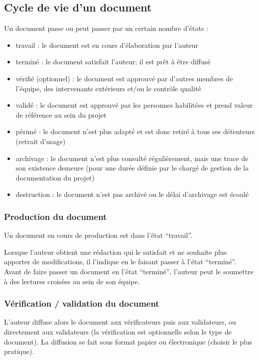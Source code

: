 \documentclass[a4paper]{article}
\begin{document}

\subsection{Cycle de vie d'un document}

Un document passe ou peut passer par un certain nombre d'états :

\begin{itemize}
\item travail : le document est en cours d'élaboration par l'auteur
\item terminé : le document satisfait l'auteur; il est prêt à être diffusé
\item vérifié (optionnel) : le document est approuvé par d'autres membres de l'équipe, des intervenants extérieurs et/ou le contrôle qualité
\item validé : le document est approuvé par les personnes habilitées et prend valeur de référence au sein du projet
\item périmé : le document n’est plus adapté et est donc retiré à tous ses détenteurs (retrait d'usage)
\item archivage : le document n'est plus consulté régulièrement, mais une trace de son existence demeure (pour une durée définie par le chargé de gestion de la documentation du projet)
\item destruction : le document n'est pas archivé ou le délai d'archivage est écoulé
\end{itemize}


\subsubsection{Production du document}

Un document en cours de production est dans l'état ``travail''.

Lorsque l'auteur obtient une rédaction qui le satisfait et ne souhaite plus apporter de modifications, il l'indique en le faisant passer à l'état ``terminé''.
Avant de faire passer un document en l'état ``terminé'', l'auteur peut le soumettre à des lectures croisées au sein de son équipe.

\subsubsection{Vérification / validation du document}

L'auteur diffuse alors le document aux vérificateurs puis aux validateurs, ou directement aux validateurs (la vérification est optionnelle selon le type de document). La diffusion se fait sous format papier ou électronique (choisir le plus pratique).
\end{document}
